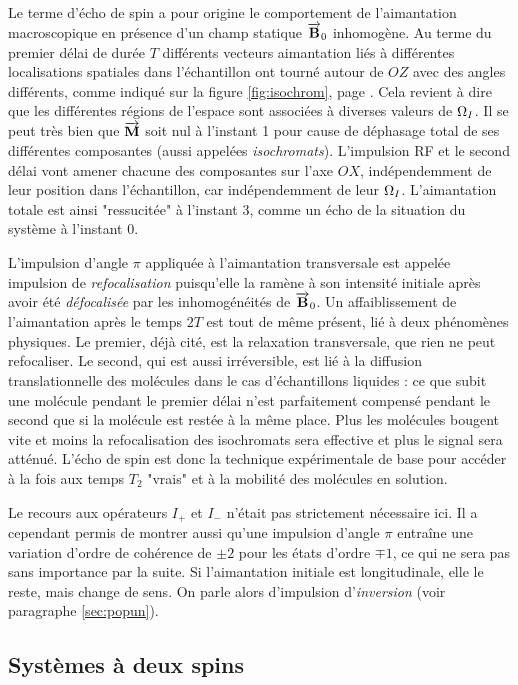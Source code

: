 Le terme d'écho de spin a pour origine le comportement de l'aimantation
macroscopique en présence d'un champ statique $\overrightarrow{\mathbf{B}}_0$ inhomogène.
Au terme du premier délai de durée $T$ différents vecteurs aimantation
liés à différentes localisations spatiales dans l'échantillon ont tourné
autour de $OZ$ avec des angles différents, comme indiqué sur la
figure \ref{fig:isochrom}, page \pageref{fig:isochrom}.
Cela revient à dire que les différentes régions de l'espace
sont associées à diverses valeurs de $\Omega_I$.
Il se peut très bien que $\overrightarrow{\mathbf{M}}$ soit nul à l'instant 1 pour cause
de déphasage total de ses différentes composantes (aussi appelées \emph{isochromats}).
L'impulsion RF et le second délai vont amener chacune des composantes sur
l'axe $OX$, indépendemment de leur position dans l'échantillon, 
car indépendemment de leur $\Omega_I$.
L'aimantation totale est ainsi "ressucitée" à l'instant 3, comme un écho
de la situation du système à l'instant 0.

L'impulsion d'angle $\pi$ appliquée à l'aimantation transversale est
appelée impulsion de \emph{refocalisation} puisqu'elle la ramène à son intensité
initiale après avoir été \emph{défocalisée} par les inhomogénéités de $\overrightarrow{\mathbf{B}}_0$.
Un affaiblissement de l'aimantation après le temps $2T$ est tout de même présent, 
lié à deux phénomènes physiques. 
Le premier, déjà cité, est la relaxation transversale, que rien ne peut refocaliser.
Le second, qui est aussi irréversible, 
est lié à la diffusion translationnelle des molécules dans le cas
d'échantillons liquides : ce que subit une molécule pendant le premier délai
n'est parfaitement compensé pendant le second que si la molécule est restée à la même place.
Plus les molécules bougent vite et moins la refocalisation des isochromats
sera effective et plus le signal sera atténué.
L'écho de spin est donc la technique expérimentale de base pour accéder à la fois
aux temps $T_2$ "vrais" et à la mobilité des molécules en solution.

Le recours aux opérateurs $I_+$ et $I_-$ n'était pas strictement nécessaire ici.
Il a cependant permis de montrer aussi qu'une impulsion d'angle $\pi$ entraîne
une variation d'ordre de cohérence de $\pm 2$ pour les états d'ordre $\mp 1$,
ce qui ne sera pas sans importance par la suite.
Si l'aimantation initiale est longitudinale, elle le reste, mais change de sens.
On parle alors d'impulsion d'\emph{inversion} (voir paragraphe \ref{sec:popun}).

\subsection{Systèmes à deux spins}

